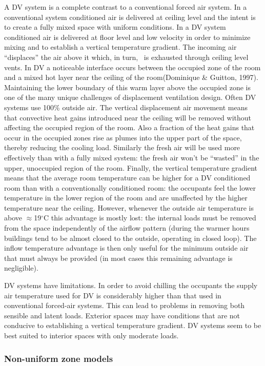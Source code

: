 A DV system is a complete contrast to a conventional forced air system. In a conventional system conditioned air is delivered at ceiling level and the intent is to create a fully mixed space with uniform conditions. In a DV system conditioned air is delivered at floor level and low velocity in order to minimize mixing and to establish a vertical temperature gradient. The incoming air ``displaces'' the air above it which, in turn,~ is exhausted through ceiling level vents. In DV a noticeable interface occurs between the occupied zone of the room and a mixed hot layer near the ceiling of the room(Dominique \& Guitton, 1997). Maintaining the lower boundary of this warm layer above the occupied zone is one of the many unique challenges of displacement ventilation design. Often DV systems use 100\% outside air. The vertical displacement air movement means that convective heat gains introduced near the ceiling will be removed without affecting the occupied region of the room. Also a fraction of the heat gains that occur in the occupied zones rise as plumes into the upper part of the space, thereby reducing the cooling load. Similarly the fresh air will be used more effectively than with a fully mixed system: the fresh air won't be ``wasted'' in the upper, unoccupied region of the room. Finally, the vertical temperature gradient means that the average room temperature can be higher for a DV conditioned room than with a conventionally conditioned room: the occupants feel the lower temperature in the lower region of the room and are unaffected by the higher temperature near the ceiling. However, whenever the outside air temperature is above \(\approx\)19\(^{\circ}\)C this advantage is mostly lost: the internal loads must be removed from the space independently of the airflow pattern (during the warmer hours buildings tend to be almost closed to the outside, operating in closed loop). The inflow temperature advantage is then only useful for the minimum outside air that must always be provided (in most cases this remaining advantage is negligible).

DV systems have limitations. In order to avoid chilling the occupants the supply air temperature used for DV is considerably higher than that used in conventional forced-air systems. This can lead to problems in removing both sensible and latent loads. Exterior spaces may have conditions that are not conducive to establishing a vertical temperature gradient. DV systems seem to be best suited to interior spaces with only moderate loads.

\subsubsection{Non-uniform zone models}\label{non-uniform-zone-models}

